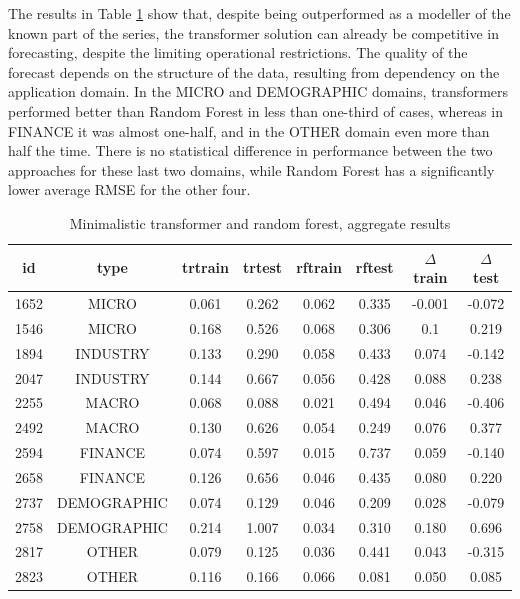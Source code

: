 \documentclass[algorithms,article,submit,pdftex,moreauthors]{Definitions/mdpi}
\begin{document}
The results in Table \ref{tab:aggregate}  show that, despite being outperformed as a modeller of the known part of the series, the transformer solution can already be competitive in forecasting, despite the limiting operational restrictions. The quality of the forecast depends on the structure of the data, resulting from dependency on the application domain. In the MICRO and DEMOGRAPHIC domains, transformers performed better than Random Forest in less than one-third of cases, whereas in FINANCE it was almost one-half, and in the OTHER domain even more than half the time. There is no statistical difference in performance between the two approaches for these last two domains, while Random Forest has a significantly lower average RMSE for the other four.


\begin{table}[H]
\caption{Minimalistic transformer and random forest, aggregate results}
\label{tab:aggregate}
\centering
\begin{tabular}{cccccccc}
\toprule
id   & type        & trtrain & trtest & rftrain & rftest & $\Delta$train & $\Delta$test\\
\midrule
1652 & MICRO       & 0.061 & 0.262 & 0.062 & 0.335 & -0.001 &-0.072\\
1546 & MICRO       & 0.168 & 0.526 & 0.068 & 0.306 & 0.1   &  0.219\\
1894 & INDUSTRY    & 0.133 & 0.290 & 0.058 & 0.433 & 0.074 & -0.142\\
2047 & INDUSTRY    & 0.144 & 0.667 & 0.056 & 0.428 & 0.088 &  0.238\\
2255 & MACRO       & 0.068 & 0.088 & 0.021 & 0.494 & 0.046 & -0.406\\
2492 & MACRO       & 0.130 & 0.626 & 0.054 & 0.249 & 0.076 &  0.377\\
2594 & FINANCE     & 0.074 & 0.597 & 0.015 & 0.737 & 0.059 & -0.140\\
2658 & FINANCE     & 0.126 & 0.656 & 0.046 & 0.435 & 0.080 &  0.220\\
2737 & DEMOGRAPHIC & 0.074 & 0.129 & 0.046 & 0.209 & 0.028 & -0.079\\
2758 & DEMOGRAPHIC & 0.214 & 1.007 & 0.034 & 0.310 & 0.180 &  0.696\\
2817 & OTHER       & 0.079 & 0.125 & 0.036 & 0.441 & 0.043 & -0.315\\
2823 & OTHER       & 0.116 & 0.166 & 0.066 & 0.081 & 0.050 &  0.085\\
\bottomrule
\end{tabular}
\end{table}
\end{document}
